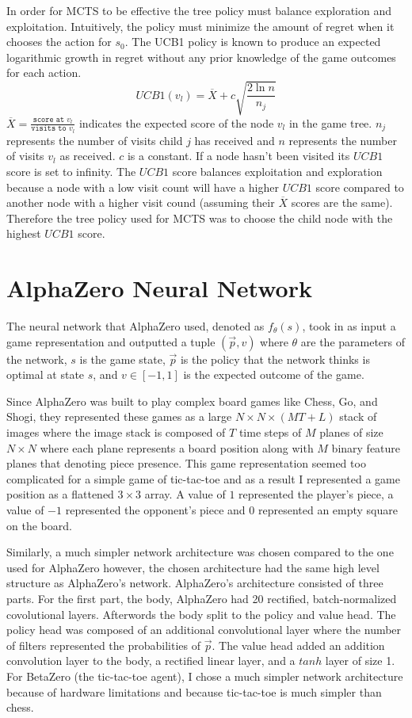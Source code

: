 \documentclass[letterpaper]{article} %
\begin{document}
  In order for MCTS to be effective the tree policy must balance exploration and
  exploitation. Intuitively, the policy must minimize the amount of regret when
  it chooses the action for $s_0$. The UCB1 policy is known to produce an
  expected logarithmic growth in regret without any prior knowledge of the game
  outcomes for each action.
  \[UCB1(v_l) = \overline{X} + c\sqrt{\frac{2\ln{n}}{n_j}}\]
  $\overline{X} = \frac{\texttt{score at $v_l$}}{\texttt{visits to $v_l$}}$
  indicates the expected score of the node $v_l$ in the game tree. $n_j$
  represents the number of visits child $j$ has received and $n$ represents the
  number of visits $v_l$ as received. $c$ is a constant. If a node hasn't been
  visited its $UCB1$ score is set to infinity. The $UCB1$ score balances
  exploitation and exploration because a node with a low visit count will have a
  higher $UCB1$ score compared to another node with a higher visit cound
  (assuming their $\overline{X}$ scores are the same). Therefore the tree policy
  used for MCTS was to choose the child node with the highest $UCB1$ score.

  \section{AlphaZero Neural Network}
  The neural network that AlphaZero used, denoted as $f_\theta(s)$, took in as
  input a game representation and outputted a tuple $(\vec{p}, v)$ where
  $\theta$ are the parameters of the network, $s$ is the game state, $\vec{p}$
  is the policy that the network thinks is optimal at state $s$, and $v \in [-1,
  1]$ is the expected outcome of the game.

  Since AlphaZero was built to play complex board games like Chess, Go, and
  Shogi, they represented these games as a large $N \times N \times (MT + L)$
  stack of images where the image stack is composed of $T$ time steps of
  $M$ planes of size $N\times N$ where each plane represents a board position
  along with $M$ binary feature planes that denoting piece presence.
  \cite{Silver1140} 
  This game
  representation seemed too complicated for a simple game of tic-tac-toe and as
  a result I represented a game position as a flattened $3\times 3$ array. A
  value of $1$ represented the player's piece, a value of $-1$ represented the
  opponent's piece and $0$ represented an empty square on the board.

  Similarly, a much simpler network architecture was chosen compared to the one
  used for AlphaZero however, the chosen architecture had the same high level
  structure as AlphaZero's network. AlphaZero's architecture consisted of three
  parts. For the first part, the body, AlphaZero had 20 rectified,
  batch-normalized covolutional layers. Afterwords the body split to the policy
  and value head. The policy head was composed of an additional convolutional
  layer where the number of filters represented the probabilities of $\vec{p}$.
  The value head added an addition convolution layer to the body, a
  rectified linear layer, and a $tanh$ layer of size 1. For BetaZero (the
  tic-tac-toe agent), I chose a much simpler network architecture because of
  hardware limitations and because tic-tac-toe is much simpler than chess.
\end{document}
